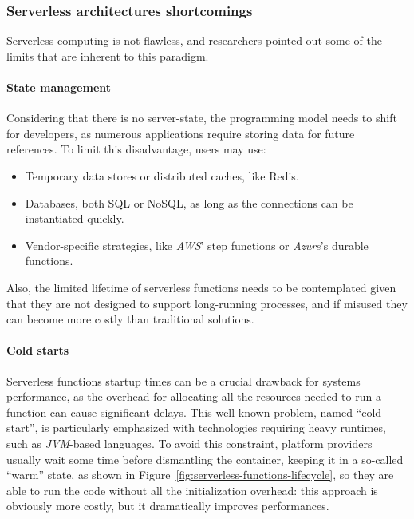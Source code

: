 \subsubsection{Serverless architectures shortcomings}

Serverless computing is not flawless, and researchers \cite{two-steps-back}
pointed out some of the limits that are inherent to this paradigm.

\paragraph{\textbf{State management}} Considering that there is no server-state,
the programming model needs to shift for developers, as numerous applications require
storing data for future references.
To limit this disadvantage, users may use:
\begin{itemize}
  \item Temporary data stores or distributed caches, like Redis.
  \item Databases, both SQL or NoSQL, as long as the connections can be instantiated quickly.
  \item Vendor-specific strategies, like \textit{AWS}' step functions or \textit{Azure}'s durable functions.
\end{itemize}
Also, the limited lifetime of serverless functions needs to be contemplated given that
they are not designed to support long-running processes,
and if misused they can become more costly than traditional solutions.

\paragraph{\textbf{Cold starts}} Serverless functions startup times
can be a crucial drawback for systems performance, as the overhead for
allocating all the resources needed to run a function can cause significant
delays. This well-known problem, named ``cold start'', is
particularly emphasized with technologies requiring heavy runtimes, such as \textit{JVM}-based languages.
To avoid this constraint, platform providers usually wait some time
before dismantling the container, keeping it in a so-called ``warm'' state, as shown in Figure~\ref{fig:serverless-functions-lifecycle},
so they are able to run the code without all the initialization overhead:
this approach is obviously more costly, but it dramatically improves performances.

